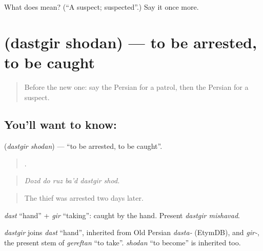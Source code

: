 \begin{tcolorbox}[breakable,colback=teal!4,colframe=teal!35!black,title={Before you move on}]
What does  mean? (\textquotedblleft{}A suspect; suspected\textquotedblright{}.) Say it once more.
\end{tcolorbox}
\section[\texorpdfstring{\fa{دستگیر} \fa{شدن} (dastgir shodan)}{دستگیر شدن (dastgir shodan)}]{  (dastgir shodan) — to be arrested, to be caught}

\label{lesson:FA-C319-dastgir-shodan}



\begin{quote}
Before the new one: say the Persian for a patrol, then the Persian for a suspect.
\end{quote}

\subsection*{You'll want to know:  }
\textbf{ } (\emph{dastgir shodan}) — \textquotedblleft{}to be arrested, to be caught\textquotedblright{}.

\begin{quote}
     .
\end{quote}

\begin{quote}
\emph{Dozd do ruz ba'd dastgir shod.}
\end{quote}

\begin{quote}
The thief was arrested two days later.
\end{quote}

\emph{dast} \textquotedblleft{}hand\textquotedblright{} + \emph{gir} \textquotedblleft{}taking\textquotedblright{}: caught by the hand. Present \emph{dastgir mishavad}.

\begin{cousinweb}
\emph{dastgir} joins \emph{dast} \textquotedblleft{}hand\textquotedblright{}, inherited from Old Persian \emph{dasta-} (EtymDB), and \emph{gir-}, the present stem of \emph{gereftan} \textquotedblleft{}to take\textquotedblright{}. \emph{shodan} \textquotedblleft{}to become\textquotedblright{} is inherited too.
\end{cousinweb}

